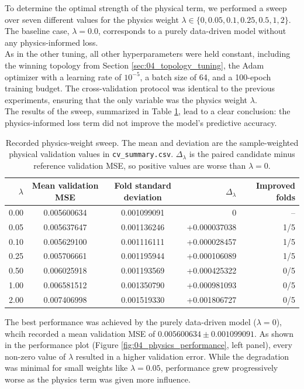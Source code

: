 To determine the optimal strength of the physical term, we performed a sweep over seven different values for the physics weight $\lambda\in\{0,0.05,0.1,0.25,0.5,1,2\}$. The baseline case, $\lambda=0.0$, corresponds to a purely data-driven model without any physics-informed loss.\\

As in the other tuning, all other hyperparameters were held constant, including the winning topology from Section \ref{sec:04_topology_tuning}, the Adam optimizer with a learning rate of $10^{-5}$, a batch size of 64, and a 100-epoch training budget. The cross-validation protocol was identical to the previous experiments, ensuring that the only variable was the physics weight $\lambda$.\\

The results of the sweep, summarized in Table \ref{tab:04_physics_results}, lead to a clear conclusion: the physics-informed loss term did not improve the model's predictive accuracy.

\begin{table}[h!]
    \centering
    \begin{tabular}{rccrr}
        \hline
        $\lambda$ & Mean validation MSE & Fold standard deviation & $\Delta_{\lambda}$ & Improved folds \\
        \hline
        0.00 & 0.005600634 & 0.001099091 & 0 & -- \\
        0.05 & 0.005637647 & 0.001136246 & +0.000037038 & 1/5 \\
        0.10 & 0.005629100 & 0.001116111 & +0.000028457 & 1/5 \\
        0.25 & 0.005706661 & 0.001195944 & +0.000106089 & 1/5 \\
        0.50 & 0.006025918 & 0.001193569 & +0.000425322 & 0/5 \\
        1.00 & 0.006581512 & 0.001350790 & +0.000981093 & 0/5 \\
        2.00 & 0.007406998 & 0.001519330 & +0.001806727 & 0/5 \\
        \hline
    \end{tabular}
    \caption{Recorded physics-weight sweep. The mean and deviation are the sample-weighted physical validation values in \texttt{cv\_summary.csv}. $\Delta_{\lambda}$ is the paired candidate minus reference validation MSE, so positive values are worse than $\lambda=0$.}
    \label{tab:04_physics_results}
\end{table}

The best performance was achieved by the purely data-driven model ($\lambda=0$), whcih recorded a mean validation MSE of $0.005600634\pm0.001099091$. As shown in the performance plot (Figure \ref{fig:04_physics_performance}, left panel), every non-zero value of $\lambda$ resulted in a higher validation error. While the degradation was minimal for small weights like $\lambda=0.05$, performance grew progressively worse as the physics term was given more influence.\\

